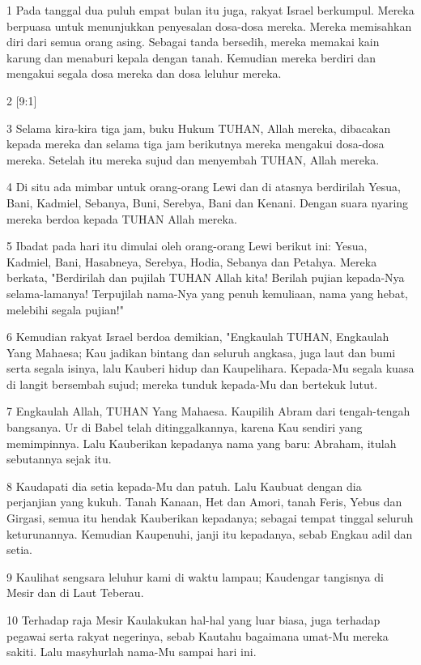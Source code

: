 \par 1 Pada tanggal dua puluh empat bulan itu juga, rakyat Israel berkumpul. Mereka berpuasa untuk menunjukkan penyesalan dosa-dosa mereka. Mereka memisahkan diri dari semua orang asing. Sebagai tanda bersedih, mereka memakai kain karung dan menaburi kepala dengan tanah. Kemudian mereka berdiri dan mengakui segala dosa mereka dan dosa leluhur mereka.
\par 2 [9:1]
\par 3 Selama kira-kira tiga jam, buku Hukum TUHAN, Allah mereka, dibacakan kepada mereka dan selama tiga jam berikutnya mereka mengakui dosa-dosa mereka. Setelah itu mereka sujud dan menyembah TUHAN, Allah mereka.
\par 4 Di situ ada mimbar untuk orang-orang Lewi dan di atasnya berdirilah Yesua, Bani, Kadmiel, Sebanya, Buni, Serebya, Bani dan Kenani. Dengan suara nyaring mereka berdoa kepada TUHAN Allah mereka.
\par 5 Ibadat pada hari itu dimulai oleh orang-orang Lewi berikut ini: Yesua, Kadmiel, Bani, Hasabneya, Serebya, Hodia, Sebanya dan Petahya. Mereka berkata, "Berdirilah dan pujilah TUHAN Allah kita! Berilah pujian kepada-Nya selama-lamanya! Terpujilah nama-Nya yang penuh kemuliaan, nama yang hebat, melebihi segala pujian!"
\par 6 Kemudian rakyat Israel berdoa demikian, "Engkaulah TUHAN, Engkaulah Yang Mahaesa; Kau jadikan bintang dan seluruh angkasa, juga laut dan bumi serta segala isinya, lalu Kauberi hidup dan Kaupelihara. Kepada-Mu segala kuasa di langit bersembah sujud; mereka tunduk kepada-Mu dan bertekuk lutut.
\par 7 Engkaulah Allah, TUHAN Yang Mahaesa. Kaupilih Abram dari tengah-tengah bangsanya. Ur di Babel telah ditinggalkannya, karena Kau sendiri yang memimpinnya. Lalu Kauberikan kepadanya nama yang baru: Abraham, itulah sebutannya sejak itu.
\par 8 Kaudapati dia setia kepada-Mu dan patuh. Lalu Kaubuat dengan dia perjanjian yang kukuh. Tanah Kanaan, Het dan Amori, tanah Feris, Yebus dan Girgasi, semua itu hendak Kauberikan kepadanya; sebagai tempat tinggal seluruh keturunannya. Kemudian Kaupenuhi, janji itu kepadanya, sebab Engkau adil dan setia.
\par 9 Kaulihat sengsara leluhur kami di waktu lampau; Kaudengar tangisnya di Mesir dan di Laut Teberau.
\par 10 Terhadap raja Mesir Kaulakukan hal-hal yang luar biasa, juga terhadap pegawai serta rakyat negerinya, sebab Kautahu bagaimana umat-Mu mereka sakiti. Lalu masyhurlah nama-Mu sampai hari ini.
